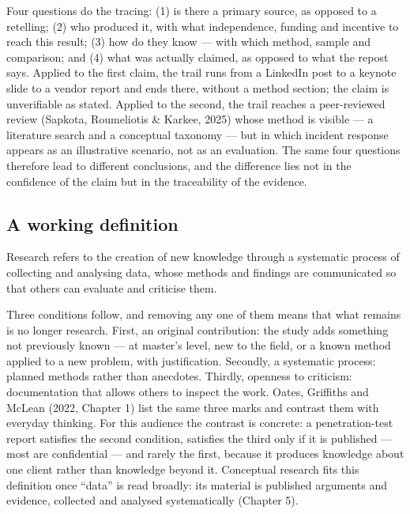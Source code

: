 \documentclass[11pt,a4paper,british,twoside=false,headings=small,chapterprefix=false,numbers=noenddot]{scrbook}
\newenvironment{block}[1]{\begin{tcolorbox}[scriptbox, title={#1}]}{\end{tcolorbox}}
\begin{document}
Four questions do the tracing: (1) is there a primary source, as opposed to a retelling; (2) who produced it, with what independence, funding and incentive to reach this result; (3) how do they know --- with which method, sample and comparison; and (4) what was actually claimed, as opposed to what the repost says. Applied to the first claim, the trail runs from a LinkedIn post to a keynote slide to a vendor report and ends there, without a method section; the claim is unverifiable as stated. Applied to the second, the trail reaches a peer-reviewed review (Sapkota, Roumeliotis \& Karkee, 2025) whose method is visible --- a literature search and a conceptual taxonomy --- but in which incident response appears as an illustrative scenario, not as an evaluation. The same four questions therefore lead to different conclusions, and the difference lies not in the confidence of the claim but in the traceability of the evidence.

\subsection{A working definition}

\begin{block}{Research (working definition for this course)}
Research refers to the creation of new knowledge through a systematic process of collecting and analysing data, whose methods and findings are communicated so that others can evaluate and criticise them.
\end{block}

Three conditions follow, and removing any one of them means that what remains is no longer research. First, an original contribution: the study adds something not previously known --- at master's level, new to the field, or a known method applied to a new problem, with justification. Secondly, a systematic process: planned methods rather than anecdotes. Thirdly, openness to criticism: documentation that allows others to inspect the work. Oates, Griffiths and McLean (2022, Chapter 1) list the same three marks and contrast them with everyday thinking. For this audience the contrast is concrete: a penetration-test report satisfies the second condition, satisfies the third only if it is published --- most are confidential --- and rarely the first, because it produces knowledge about one client rather than knowledge beyond it. Conceptual research fits this definition once ``data'' is read broadly: its material is published arguments and evidence, collected and analysed systematically (Chapter 5).
\end{document}
